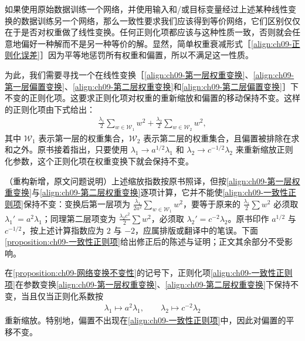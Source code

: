 \documentclass[../../main.tex]{subfiles}
\begin{document}
如果使用原始数据训练一个网络，并使用输入和/或目标变量经过上述某种线性变换的数据训练另一个网络，那么一致性要求我们应该得到等价网络，它们区别仅仅在于是否对权重做了线性变换。任何正则化项都应该与这种性质一致，否则就会任意地偏好一种解而不是另一种等价的解。显然，简单权重衰减形式［\eqref{align:ch09-正则化误差}］因为平等地惩罚所有权重和偏置，所以不满足这一性质。

为此，我们需要寻找一个在线性变换［\eqref{align:ch09-第一层权重变换}、\eqref{align:ch09-第一层偏置变换}、\eqref{align:ch09-第二层权重变换}和\eqref{align:ch09-第二层偏置变换}］下不变的正则化项。这要求正则化项对权重的重新缩放和偏置的移动保持不变。这样的正则化项由下式给出：
\begin{align}
\frac{\lambda_{1}}{2}\sum_{w\in\mathcal{W}_{1}}w^{2}+\frac{\lambda_{2}}{2}\sum_{w\in\mathcal{W}_{2}}w^{2},
\label{align:ch09-一致性正则项}
\end{align}
其中 $\mathcal{W}_{1}$ 表示第一层的权重集合，$\mathcal{W}_{2}$ 表示第二层的权重集合，且偏置被排除在求和之外。原书接着指出，只要使用 $\lambda_{1}\to a^{1/2}\lambda_{1}$ 和 $\lambda_{2}\to c^{-1/2}\lambda_{2}$ 来重新缩放正则化参数，这个正则化项在权重变换下就会保持不变。

\begin{remark}（重构新增，原文问题说明）上述缩放指数按原书照译，但按\eqref{align:ch09-第一层权重变换}与\eqref{align:ch09-第二层权重变换}逐项计算，它并不能使\eqref{align:ch09-一致性正则项}保持不变：变换后第一层项为 $\frac{\lambda_{1}}{2a^{2}}\sum_{w\in\mathcal{W}_{1}}w^{2}$，要等于原来的 $\frac{\lambda_{1}}{2}\sum w^{2}$ 必须取 $\lambda_{1}'=a^{2}\lambda_{1}$；同理第二层项变为 $\frac{\lambda_{2}c^{2}}{2}\sum w^{2}$，必须取 $\lambda_{2}'=c^{-2}\lambda_{2}$。原书印作 $a^{1/2}$ 与 $c^{-1/2}$，按上述计算指数应为 $2$ 与 $-2$，应属排版或翻译中的笔误。下面\cref{proposition:ch09-一致性正则项}给出修正后的陈述与证明；正文其余部分不受影响。
\end{remark}

\begin{proposition}[一致性正则项]\label{proposition:ch09-一致性正则项}
在\cref{proposition:ch09-网络变换不变性}的记号下，正则化项\eqref{align:ch09-一致性正则项}在参数变换\eqref{align:ch09-第一层权重变换}、\eqref{align:ch09-第二层权重变换}下保持不变，当且仅当正则化系数按
\begin{align*}
\lambda_{1}\longmapsto a^{2}\lambda_{1},\qquad \lambda_{2}\longmapsto c^{-2}\lambda_{2}
\end{align*}
重新缩放。特别地，偏置不出现在\eqref{align:ch09-一致性正则项}中，因此对偏置的平移不变。
\end{proposition}
\end{document}
